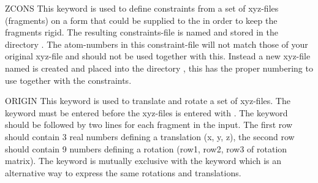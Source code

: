 \begin{keywordlist}
\item[ZCONS]
This keyword is used to define constraints from a set of xyz-files (fragments)
on a form that could be supplied to the
  in order to keep the fragments rigid. The resulting constraints-file
is named  and stored in the directory . The
atom-numbers in this constraint-file will not match those of your original xyz-file and
should not be used together with this. Instead a new xyz-file named  is created
and placed into the directory , this has the proper numbering to use together with the constraints.

\item[ORIGIN]
This keyword is used to translate and rotate a set of xyz-files. The keyword must be entered
before the xyz-files is entered with .
The keyword should be followed by two lines for each fragment in the input.
The first row should contain 3 real numbers defining a translation (x, y, z),
the second row should contain 9 numbers defining a rotation (row1, row2, row3 of
rotation matrix). The keyword  is mutually exclusive with the keyword 
which is an alternative way to express the same rotations and translations.


\end{keywordlist}
